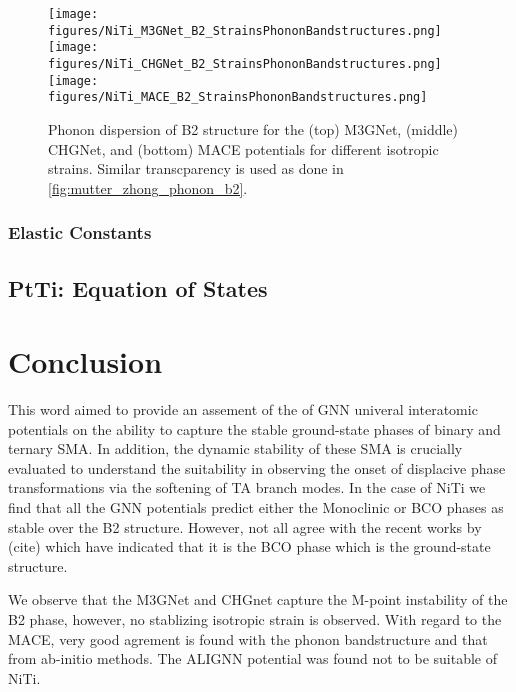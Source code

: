 \documentclass[preprint,colorlinks=true,linkcolor=black,citecolor=black]{elsarticle}
\begin{document}
\begin{figure}[!htp]
  \begin{centering}
    \texttt{[image: figures/NiTi\_M3GNet\_B2\_StrainsPhononBandstructures.png]}
    \vspace{1mm}
    \texttt{[image: figures/NiTi\_CHGNet\_B2\_StrainsPhononBandstructures.png]}
    \vspace{1mm}
    \texttt{[image: figures/NiTi\_MACE\_B2\_StrainsPhononBandstructures.png]}
    \caption{ Phonon dispersion of B2 structure for the (top) M3GNet,
      (middle) CHGNet, and (bottom) MACE potentials for different
      isotropic strains. Similar transcparency is used as done in
      \ref{fig:mutter_zhong_phonon_b2}.  }
    \label{fig:gnn_phonon_b2}
  \end{centering}
\end{figure}



\subsubsection{Elastic Constants}



\subsection{PtTi: Equation of States}
\label{sec:ptti_eos}



\section{Conclusion}
\label{sec:conclusion}
This word aimed to provide an assement of the of GNN univeral
interatomic potentials on the ability to capture the stable
ground-state phases of binary and ternary SMA. In addition, the
dynamic stability of these SMA is crucially evaluated to understand
the suitability in observing the onset of displacive phase
transformations via the softening of TA branch modes. In the case of
NiTi we find that all the GNN potentials predict either the Monoclinic
or BCO phases as stable over the B2 structure. However, not all agree
with the recent works by (cite) which have indicated that it is the
BCO phase which is the ground-state structure.

We observe that the M3GNet and CHGnet capture the M-point instability
of the B2 phase, however, no stablizing isotropic strain is
observed. With regard to the MACE, very good agrement is found with
the phonon bandstructure and that from ab-initio methods. The ALIGNN
potential was found not to be suitable of NiTi.
\end{document}
